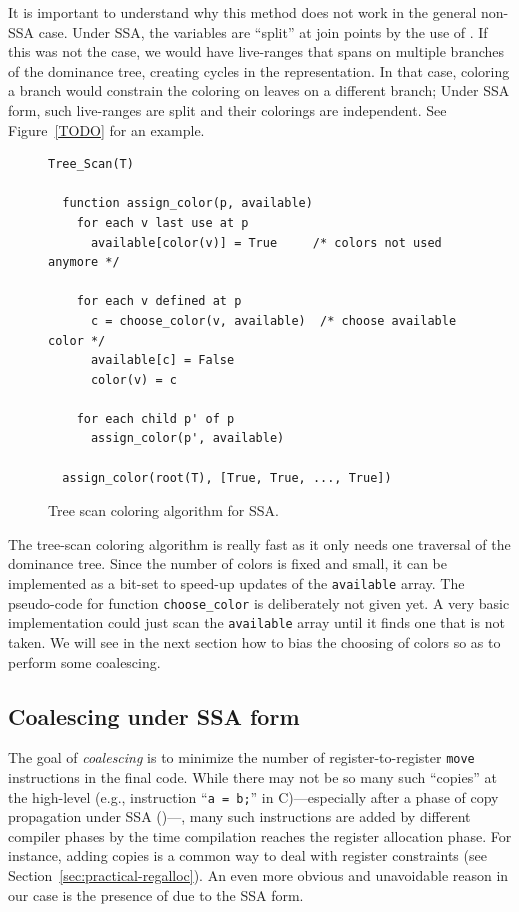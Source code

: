 {\begin{important}
It is important to understand why this method does not work in the general non-SSA case.
Under SSA, the variables are ``split'' at join points by the use of \phifuns.
If this was not the case, we would have live-ranges that spans on multiple branches of the dominance tree, creating cycles in the representation.
In that case, coloring a branch would constrain the coloring on leaves on a different branch; Under SSA form, such live-ranges are split and their colorings are independent.
See Figure~\ref{TODO} for an example.
\end{important}


\begin{figure}
  \begin{verbatim}
Tree_Scan(T)

  function assign_color(p, available)
    for each v last use at p
      available[color(v)] = True     /* colors not used anymore */

    for each v defined at p
      c = choose_color(v, available)  /* choose available color */
      available[c] = False
      color(v) = c

    for each child p' of p
      assign_color(p', available)

  assign_color(root(T), [True, True, ..., True])

  \end{verbatim}
  \caption{Tree scan coloring algorithm for SSA.}
  \label{code:assign-tree-scan}
\end{figure}


The tree-scan coloring algorithm is really fast as it only needs one traversal of the dominance tree. 
Since the number of colors is fixed and small, it can be implemented as a bit-set to speed-up updates of the {\tt available} array.
The pseudo-code for function {\tt choose\_color} is deliberately not given yet. 
A very basic implementation could just scan the {\tt available} array until it finds one that is not taken.
We will see in the next section how to bias the choosing of colors so as to perform some coalescing. 
 


\subsection{Coalescing under SSA form}

The goal of \emph{coalescing} is to minimize the number of register-to-register {\tt move} instructions in the final code.
While there may not be so many such ``copies'' at the high-level (e.g., instruction ``{\tt a = b;}'' in C)---especially after a phase of copy propagation under SSA ()---,
many such instructions are added by different compiler phases by the time compilation reaches the register allocation phase.
For instance, adding copies is a common way to deal with register constraints (see Section~\ref{sec:practical-regalloc}). 
An even more obvious and unavoidable reason in our case is the presence of \phifuns due to the SSA form. 

}
